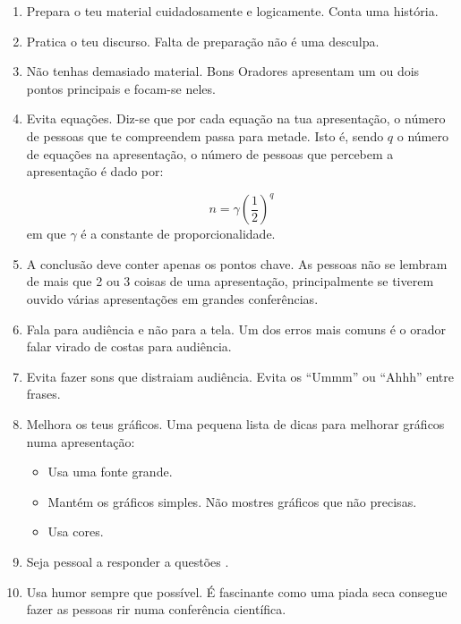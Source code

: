 \documentclass[12pt]{article}
\begin{document}
\begin{enumerate}

\item Prepara o teu material cuidadosamente e logicamente. Conta uma história.

\item Pratica o teu discurso. Falta de preparação não é uma desculpa.

\item Não tenhas demasiado material. Bons Oradores apresentam um ou dois pontos principais e focam-se neles.

\item Evita equações. Diz-se que por cada equação na tua apresentação, o número de pessoas que te compreendem passa para metade. Isto é, sendo $q$ o número de equações na apresentação, o número de pessoas que percebem a apresentação é dado por:

\begin{equation}
n = \gamma \left( \frac{1}{2} \right)^q
\end{equation}
em 	que $\gamma$ é a constante de proporcionalidade\cite{Valente1999,Boyce2010}.

\item A conclusão deve conter apenas os pontos chave. As pessoas não se lembram de mais que 2 ou 3 coisas de uma apresentação, principalmente se tiverem ouvido várias apresentações em grandes conferências.

\item Fala para audiência e não para a tela. Um dos erros mais comuns é o orador falar virado de costas para audiência. 

\item Evita fazer sons que distraiam audiência. Evita os ``Ummm'' ou ``Ahhh'' entre frases.

\item Melhora os teus gráficos. Uma pequena lista de dicas para melhorar gráficos numa apresentação:

\begin{itemize}
\item Usa uma fonte grande.

\item Mantém os gráficos simples. Não mostres gráficos que não precisas.

\item Usa cores.

\end{itemize}

\item Seja pessoal a responder a questões \cite{Strang2013,Saviani1980}.

\item Usa humor sempre que possível. É fascinante como uma piada seca consegue fazer as pessoas rir numa conferência científica.

\end{enumerate}

\printbibliography
\end{document}
